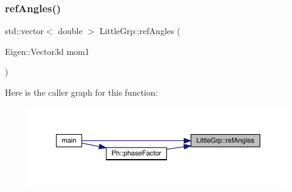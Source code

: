\subsubsection{\texorpdfstring{refAngles()}{refAngles()}}
{\footnotesize\ttfamily std\+::vector$<$ double $>$ Little\+Grp\+::ref\+Angles (\begin{DoxyParamCaption}\item[{Eigen\+::\+Vector3d}]{mom1 }\end{DoxyParamCaption})}

Here is the caller graph for this function\+:
\nopagebreak
\begin{figure}[H]
\begin{center}
\leavevmode
\includegraphics[width=350pt]{d1/d4c/namespaceLittleGrp_a93937e135b6b9c963ae9ad26516e252d_icgraph}
\end{center}
\end{figure}
